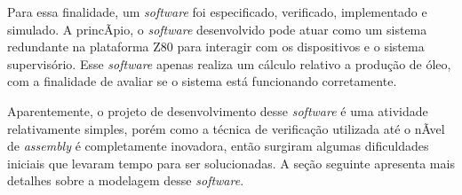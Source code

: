 \documentclass[11pt]{article} %
\begin{document}
Para essa finalidade, um \textit{software} foi especificado, verificado, implementado e simulado. A princÃ­pio, o \textit{software}
desenvolvido pode atuar como um sistema redundante na plataforma Z80 para interagir com os dispositivos e o sistema supervisório.
Esse \textit{software} apenas realiza um cálculo relativo a produção de óleo, com a finalidade de avaliar se o sistema está funcionando corretamente.


Aparentemente, o projeto de desenvolvimento desse \textit{software} é uma atividade relativamente simples,
porém como a técnica de verificação utilizada até o nÃ­vel de \textit{assembly} é completamente inovadora,
então surgiram algumas dificuldades iniciais que levaram tempo para ser solucionadas. A seção seguinte
apresenta mais detalhes sobre a modelagem desse \textit{software}. 




\end{document}

